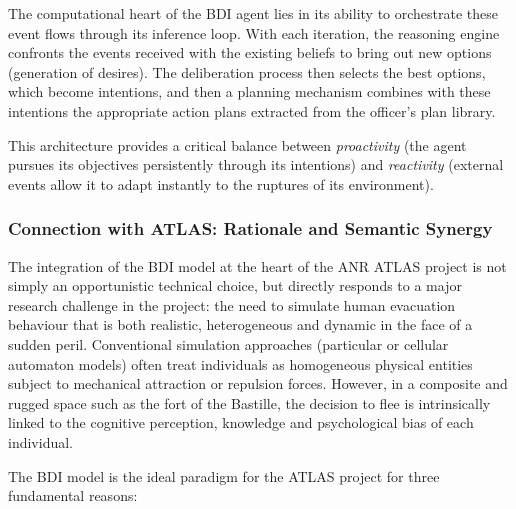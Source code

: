 \documentclass{article}
\begin{document}
The computational heart of the BDI agent lies in its ability to orchestrate these event flows through its inference loop. With each iteration, the reasoning engine confronts the events received with the existing beliefs to bring out new options (generation of desires). The deliberation process then selects the best options, which become intentions, and then a planning mechanism combines with these intentions the appropriate action plans extracted from the officer's plan library.

This architecture provides a critical balance between \textit{proactivity} (the agent pursues its objectives persistently through its intentions) and \textit{reactivity} (external events allow it to adapt instantly to the ruptures of its environment).
\subsubsection{Connection with ATLAS: Rationale and Semantic Synergy}

The integration of the BDI model at the heart of the ANR ATLAS project is not simply an opportunistic technical choice, but directly responds to a major research challenge in the project: the need to simulate human evacuation behaviour that is both realistic, heterogeneous and dynamic in the face of a sudden peril. Conventional simulation approaches (particular or cellular automaton models) often treat individuals as homogeneous physical entities subject to mechanical attraction or repulsion forces. However, in a composite and rugged space such as the fort of the Bastille, the decision to flee is intrinsically linked to the cognitive perception, knowledge and psychological bias of each individual.

The BDI model is the ideal paradigm for the ATLAS project for three fundamental reasons:
\end{document}
